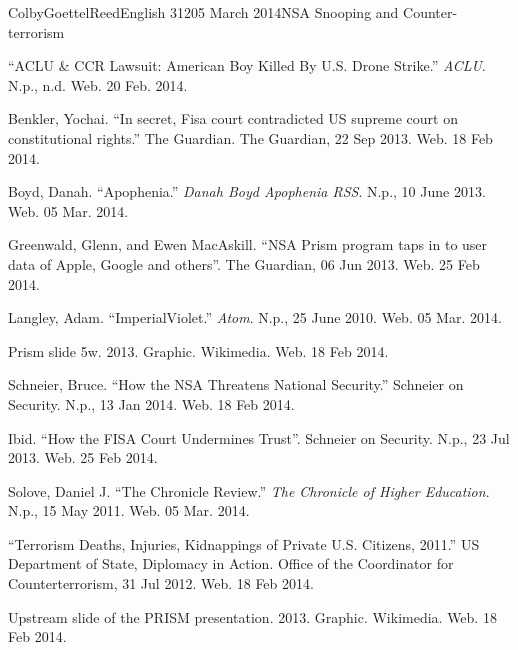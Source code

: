 \documentclass[12pt]{article}
\begin{document}
\begin{mla}{Colby}{Goettel}{Reed}{English 312}{05 March 2014}{NSA Snooping and Counter-terrorism}
\begin{workscited}
    \bibent ``ACLU \& CCR Lawsuit: American Boy Killed By U.S. Drone Strike.'' \textit{ACLU}. N.p., n.d. Web. 20 Feb. 2014.
    
    \bibent Benkler, Yochai. ``In secret, Fisa court contradicted US supreme court on constitutional rights.'' The Guardian. The Guardian, 22 Sep 2013. Web. 18 Feb 2014.
    
    \bibent Boyd, Danah. ``Apophenia.'' \textit{Danah Boyd Apophenia RSS}. N.p., 10 June 2013. Web. 05 Mar. 2014.
    
    \bibent Greenwald, Glenn, and Ewen MacAskill. ``NSA Prism program taps in to user data of Apple, Google and others''. The Guardian, 06 Jun 2013. Web. 25 Feb 2014.
    
    \bibent Langley, Adam. ``ImperialViolet.'' \textit{Atom}. N.p., 25 June 2010. Web. 05 Mar. 2014.
    
    \bibent Prism slide 5w. 2013. Graphic. Wikimedia. Web. 18 Feb 2014.
    
    \bibent Schneier, Bruce. ``How the NSA Threatens National Security.'' Schneier on Security. N.p., 13 Jan 2014. Web. 18 Feb 2014.
    
    \bibent Ibid. ``How the FISA Court Undermines Trust''. Schneier on Security. N.p., 23 Jul 2013. Web. 25 Feb 2014.
    
    \bibent Solove, Daniel J. ``The Chronicle Review.'' \textit{The Chronicle of Higher Education}. N.p., 15 May 2011. Web. 05 Mar. 2014.
    
    \bibent ``Terrorism Deaths, Injuries, Kidnappings of Private U.S. Citizens, 2011.'' US Department of State, Diplomacy in Action. Office of the Coordinator for Counterterrorism, 31 Jul 2012. Web. 18 Feb 2014.
    
    \bibent Upstream slide of the PRISM presentation. 2013. Graphic. Wikimedia. Web. 18 Feb 2014.
\end{workscited}

\end{mla}
\end{document}

